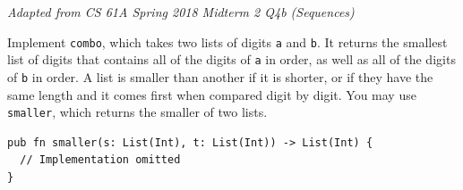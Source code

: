 
\begin{blocksection}
\question \textit{Adapted from CS 61A Spring 2018 Midterm 2 Q4b (Sequences)}

Implement \texttt{combo}, which takes two lists of digits \texttt{a} and \texttt{b}. It returns the smallest list of digits that contains all of the digits of \texttt{a} in order, as well as all of the digits of \texttt{b} in order. A list is smaller than another if it is shorter, or if they have the same length and it comes first when compared digit by digit. You may use \texttt{smaller}, which returns the smaller of two lists.
\begin{lstlisting}
pub fn smaller(s: List(Int), t: List(Int)) -> List(Int) {
  // Implementation omitted
}


\end{lstlisting}
\end{blocksection}
